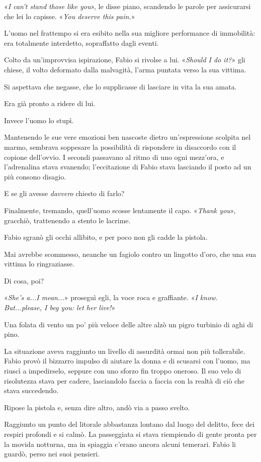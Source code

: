 «\emph{I can't stand those like you}», le disse piano, scandendo le parole per assicurarsi che lei lo capisse. «\emph{You deserve this pain.}»

L'uomo nel frattempo si era esibito nella sua migliore performance di immobilità: era totalmente interdetto, sopraffatto dagli eventi.

Colto da un'improvvisa ispirazione, Fabio si rivolse a lui. «\emph{Should I do it?}» gli chiese, il volto deformato dalla malvagità, l'arma puntata verso la sua vittima.

Si aspettava che negasse, che lo supplicasse di lasciare in vita la sua amata.

Era già pronto a ridere di lui.

Invece l'uomo lo stupì.

Mantenendo le sue vere emozioni ben nascoste dietro un'espressione scolpita nel marmo, sembrava soppesare la possibilità di rispondere in disaccordo con il copione dell'ovvio. I secondi passavano al ritmo di uno ogni mezz'ora, e l'adrenalina stava svanendo; l'eccitazione di Fabio stava lasciando il posto ad un più consono disagio.

E se gli avesse \emph{davvero} chiesto di farlo?

Finalmente, tremando, quell'uomo scosse lentamente il capo. «\emph{Thank you}», gracchiò, trattenendo a stento le lacrime.

Fabio sgranò gli occhi allibito, e per poco non gli cadde la pistola.

Mai avrebbe scommesso, neanche un fagiolo contro un lingotto d'oro, che una sua vittima lo ringraziasse.

Di cosa, poi?

«\emph{She's a...I mean...}» proseguì egli, la voce roca e graffiante. «\emph{I know. But...please, I beg you: let her live!}»

Una folata di vento un po' più veloce delle altre alzò un pigro turbinio di aghi di pino.

La situazione aveva raggiunto un livello di assurdità ormai non più tollerabile. Fabio provò il bizzarro impulso di aiutare la donna e di scusarsi con l'uomo, ma riuscì a impedirselo, seppure con uno sforzo fin troppo oneroso. Il suo velo di risolutezza stava per cadere, lasciandolo faccia a faccia con la realtà di ciò che stava succedendo.

Ripose la pistola e, senza dire altro, andò via a passo svelto.

Raggiunto un punto del litorale abbastanza lontano dal luogo del delitto, fece dei respiri profondi e si calmò. La passeggiata si stava riempiendo di gente pronta per la movida notturna, ma in spiaggia c'erano ancora alcuni temerari. Fabio li guardò, perso nei suoi pensieri.

